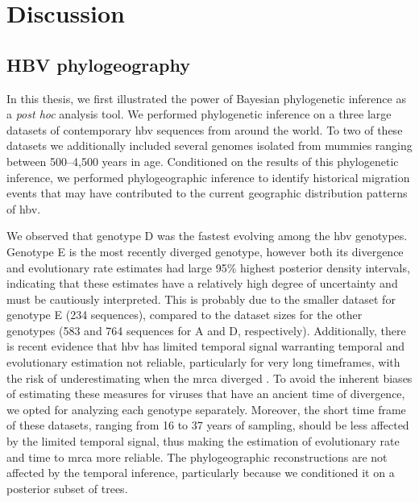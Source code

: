 \chapter{Discussion}
\label{ch:discussion}

\section{HBV phylogeography}

In this thesis, we first illustrated the power of Bayesian phylogenetic inference as a \textit{post hoc} analysis tool.
We performed phylogenetic inference on a three large datasets of contemporary \gls{hbv} sequences from around the world.
To two of these datasets we additionally included several genomes isolated from mummies ranging between 500--4,500 years in age.
Conditioned on the results of this phylogenetic inference, we performed phylogeographic inference to identify historical migration events that may have contributed to the current geographic distribution patterns of \gls{hbv}.

We observed that genotype D was the fastest evolving among the \gls{hbv} genotypes.
Genotype E is the most recently diverged genotype, however both its divergence and evolutionary rate estimates had large 95\% highest posterior density intervals, indicating that these estimates have a relatively high degree of uncertainty and must be cautiously interpreted.
This is probably due to the smaller dataset for genotype E (234 sequences), compared to the dataset sizes for the other genotypes (583 and 764 sequences for A and D, respectively).
Additionally, there is recent evidence that \gls{hbv} has limited temporal signal warranting temporal and evolutionary estimation not reliable, particularly for very long timeframes, with the risk of underestimating when the \gls{mrca} diverged \cite{ross2018paradox}.
To avoid the inherent biases of estimating these measures for viruses that have an ancient time of divergence, we opted for analyzing each genotype separately.
Moreover, the short time frame of these datasets, ranging from 16 to 37 years of sampling, should be less affected by the limited temporal signal, thus making the estimation of evolutionary rate and time to \gls{mrca} more reliable. %
The phylogeographic reconstructions are not affected by the temporal inference, particularly because we conditioned it on a posterior subset of trees.


